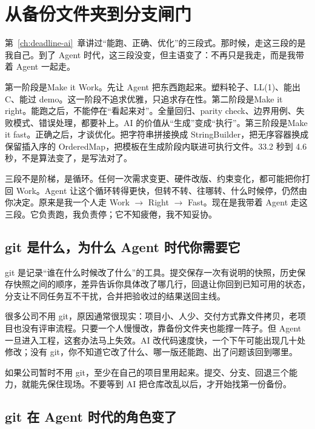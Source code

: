 \chapter{从备份文件夹到分支闸门}
\label{ch:branch-pipeline}

第~\ref{ch:deadline-ai}~章讲过“能跑、正确、优化”的三段式。那时候，走这三段的是我自己。到了 Agent 时代，这三段没变，但主语变了：不再只是我走，而是我带着 Agent 一起走。

第一阶段是Make it Work。先让 Agent 把东西跑起来。塑料轮子、LL(1)、能出 C、能过 demo。这一阶段不追求优雅，只追求存在性。第二阶段是Make it right。能跑之后，不能停在“看起来对”。全量回归、parity check、边界用例、失败模式、错误处理，都要补上。AI 的价值从“生成”变成“执行”。第三阶段是Make it fast。正确之后，才谈优化。把字符串拼接换成 StringBuilder，把无序容器换成保留插入序的 OrderedMap，把模板在生成阶段内联进可执行文件。33.2 秒到 4.6 秒，不是算法变了，是写法对了。

三段不是阶梯，是循环。任何一次需求变更、硬件改版、约束变化，都可能把你打回 Work。Agent 让这个循环转得更快，但转不转、往哪转、什么时候停，仍然由你决定。原来是我一个人走 Work $\rightarrow$ Right $\rightarrow$ Fast。现在是我带着 Agent 走这三段。它负责跑，我负责停；它不知疲倦，我不知妥协。

\section{git 是什么，为什么 Agent 时代你需要它}

git 是记录“谁在什么时候改了什么”的工具。提交保存一次有说明的快照，历史保存快照之间的顺序，差异告诉你具体改了哪几行，回退让你回到已知可用的状态，分支让不同任务互不干扰，合并把验收过的结果送回主线。

很多公司不用 git，原因通常很现实：项目小、人少、交付方式靠文件拷贝，老项目也没有评审流程。只要一个人慢慢改，靠备份文件夹也能撑一阵子。但 Agent 一旦进入工程，这套办法马上失效。AI 改代码速度快，一个下午可能出现几十处修改；没有 git，你不知道它改了什么、哪一版还能跑、出了问题该回到哪里。

如果公司暂时不用 git，至少在自己的项目里用起来。提交、分支、回退三个能力，就能先保住现场。不要等到 AI 把仓库改乱以后，才开始找第一份备份。

\section{git 在 Agent 时代的角色变了}

